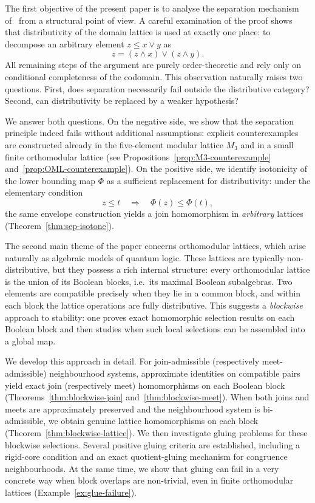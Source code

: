 \documentclass[11pt]{amsart}
\theoremstyle{definition}
\begin{document}
The first objective of the present paper is to analyse the separation mechanism of~\cite{BKP}
from a structural point of view.
A careful examination of the proof shows that distributivity of the domain lattice is used
at exactly one place: to decompose an arbitrary element $z\le x\vee y$ as
\[
z=(z\wedge x)\vee(z\wedge y).
\]
All remaining steps of the argument are purely order-theoretic and rely only on conditional
completeness of the codomain.
This observation naturally raises two questions.
First, does separation necessarily fail outside the distributive category?
Second, can distributivity be replaced by a weaker hypothesis?

We answer both questions.
On the negative side, we show that the separation principle indeed fails without additional
assumptions: explicit counterexamples are constructed already in the five-element modular
lattice $M_3$ and in a small finite orthomodular lattice (see
Propositions~\ref{prop:M3-counterexample} and~\ref{prop:OML-counterexample}).
On the positive side, we identify isotonicity of the lower bounding map $\Phi$ as a sufficient
replacement for distributivity: under the elementary condition
\[
 z\le t \quad\Longrightarrow\quad \Phi(z)\le \Phi(t),
\]
the same envelope construction yields a join homomorphism in \emph{arbitrary} lattices
(Theorem~\ref{thm:sep-isotone}).

The second main theme of the paper concerns orthomodular lattices, which arise naturally
as algebraic models of quantum logic.
These lattices are typically non-distributive, but they possess a rich internal structure:
every orthomodular lattice is the union of its Boolean blocks, i.e.\ its maximal Boolean
subalgebras.
Two elements are compatible precisely when they lie in a common block, and within each block
the lattice operations are fully distributive.
This suggests a \emph{blockwise} approach to stability:
one proves exact homomorphic selection results on each Boolean block and then studies when
such local selections can be assembled into a global map.

We develop this approach in detail.
For join-admissible (respectively meet-admissible) neighbourhood systems, approximate
identities on compatible pairs yield exact join (respectively meet) homomorphisms on each
Boolean block (Theorems~\ref{thm:blockwise-join} and~\ref{thm:blockwise-meet}).
When both joins and meets are approximately preserved and the neighbourhood system is
bi-admissible, we obtain genuine lattice homomorphisms on each block
(Theorem~\ref{thm:blockwise-lattice}).
We then investigate gluing problems for these blockwise selections.
Several positive gluing criteria are established, including a rigid-core condition and an
exact quotient-gluing mechanism for congruence neighbourhoods.
At the same time, we show that gluing can fail in a very concrete way when block overlaps are
non-trivial, even in finite orthomodular lattices
(Example~\ref{ex:glue-failure}).
\end{document}
